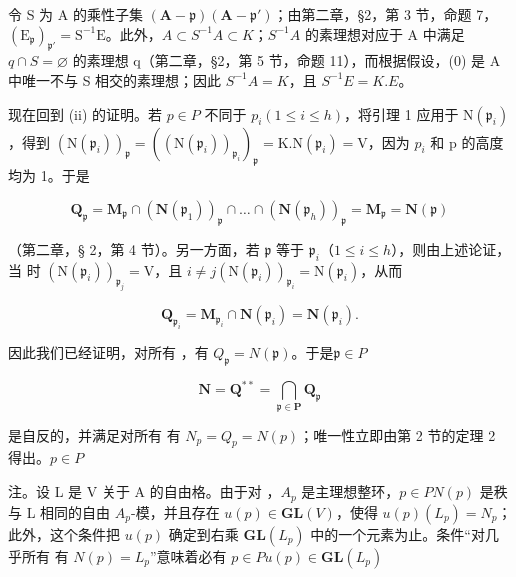 令 S 为 A 的乘性子集 \((\mathbf{A}-\mathfrak{p})(\mathbf{A}-\mathfrak{p}')\)；由第二章，§2，第 3 节，命题 7，\((\mathrm{E}_{\mathfrak{p}})_{\mathfrak{p}'}=\mathrm{S}^{-1}\mathrm{E}\)。此外，\(A\subset S^{-1}A\subset K\)；\(S^{-1}A\) 的素理想对应于 A 中满足 \(q\cap S=\varnothing\) 的素理想 q（第二章，§2，第 5 节，命题 11），而根据假设，(0) 是 A 中唯一不与 S 相交的素理想；因此 \(S^{-1}A=K\)，且 \(S^{-1}E=K.E\)。

现在回到 (ii) 的证明。若 \(p \in P\) 不同于 \(p_i (1 \leqslant i \leqslant h)\)，将引理 1 应用于 \(\mathrm{N}(\mathfrak{p}_i)\)，得到 \((\mathrm{N}(\mathfrak{p}_i))_{\mathfrak{p}} = ((\mathrm{N}(\mathfrak{p}_i))_{\mathfrak{p}_i})_{\mathfrak{p}} = \mathrm{K}. \mathrm{N}(\mathfrak{p}_i) = \mathrm{V}\)，因为 \(p_i\) 和 p 的高度均为 1。于是

\[
\mathbf {Q} _ {\mathfrak {p}} = \mathbf {M} _ {\mathfrak {p}} \cap (\mathbf {N} (\mathfrak {p} _ {1})) _ {\mathfrak {p}} \cap \dots \cap (\mathbf {N} (\mathfrak {p} _ {h})) _ {\mathfrak {p}} = \mathbf {M} _ {\mathfrak {p}} = \mathbf {N} (\mathfrak {p})
\]

（第二章，§ 2，第 4 节）。另一方面，若 \(\mathfrak{p}\) 等于 \(\mathfrak{p}_i\)（\(1 \leqslant i \leqslant h\)），则由上述论证，当  时 \((\mathrm{N}(\mathfrak{p}_i))_{\mathfrak{p}_j} = \mathrm{V}\)，且 \(i \neq j\)\((\mathrm{N}(\mathfrak{p}_i))_{\mathfrak{p}_i} = \mathrm{N}(\mathfrak{p}_i)\)，从而

\[
\mathbf {Q} _ {\mathfrak {p} _ {i}} = \mathbf {M} _ {\mathfrak {p} _ {i}} \cap \mathbf {N} (\mathfrak {p} _ {i}) = \mathbf {N} (\mathfrak {p} _ {i}).
\]

因此我们已经证明，对所有 ，有 \(Q_{\mathfrak{p}} = N(\mathfrak{p})\)。于是\(\mathfrak{p} \in P\)

\[
\mathbf {N} = \mathbf {Q} ^ {* *} = \bigcap_ {\mathfrak {p} \in \mathbf {P}} \mathbf {Q} _ {\mathfrak {p}}
\]

是自反的，并满足对所有  有 \(N_{p} = Q_{p} = N(p)\)；唯一性立即由第 2 节的定理 2 得出。\(p \in P\)

注。设 L 是 V 关于 A 的自由格。由于对 ，\(A_{p}\) 是主理想整环，\(p \in P\)\(N(p)\) 是秩与 L 相同的自由 \(A_{p}\)-模，并且存在 \(u(p) \in \mathbf{GL}(V)\)，使得 \(u(p)(L_{p}) = N_{p}\)；此外，这个条件把 \(u(p)\) 确定到右乘 \(\mathbf{GL}(L_{p})\) 中的一个元素为止。条件“对几乎所有  有 \(N(p) = L_{p}\)”意味着必有 \(p \in P\)\(u(p) \in \mathbf{GL}(L_{p})\)

